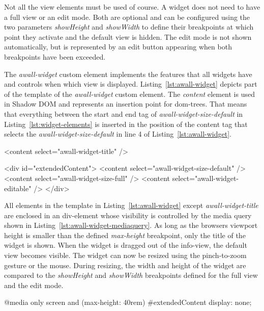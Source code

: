 \documentclass{sigchi}
\begin{document}
Not all the view elements must be used of course.
A widget does not need to have a full view or an edit mode.
Both are optional and can be configured using the two parameters \textit{showHeight} and \textit{showWidth} to define their breakpoints at which point they activate and the default view is hidden.
The edit mode is not shown automatically, but is represented by an edit button appearing when both breakpoints have been exceeded.


The \textit{awall-widget} custom element implements the features that all widgets have and controls when which view is displayed.
Listing~\ref{lst:awall-widget} depicts part of the template of the \textit{awall-widget} custom element.
The \textit{content} element is used in Shadow DOM and represents an insertion point for \gls{dom}-trees.
That means that everything between the start and end tag of \textit{awall-widget-size-default} in Listing~\ref{lst:widget-elements} is inserted in the position of the content tag that selects the \textit{awall-widget-size-default} in line 4 of Listing~\ref{lst:awall-widget}.


\begin{code}[caption={Part of the awall-widget custom element's template using insertion points for the different HTML tags.},label=lst:awall-widget]
<content select="awall-widget-title" />

<div id="extendedContent">
  <content select="awall-widget-size-default" />
  <content select="awall-widget-size-full" />
  <content select="awall-widget-editable" />
</div>
\end{code}


All elements in the template in Listing~\ref{lst:awall-widget} except \textit{awall-widget-title} are enclosed in an div-element whose visibility is controlled by the media query shown in Listing~\ref{lst:awall-widget-mediaquery}.
As long as the browsers viewport height is smaller than the defined \textit{max-height} breakpoint, only the title of the widget is shown.
When the widget is dragged out of the info-view, the default view becomes visible.
The widget can now be resized using the pinch-to-zoom gesture or the mouse.
During resizing, the width and height of the widget are compared to the \textit{showHeight} and \textit{showWidth} breakpoints defined for the full view and the edit mode.

\begin{code}[caption={Media Query hiding all the views except the title when the screen is small enough.},label=lst:awall-widget-mediaquery]
@media only screen and (max-height: 40rem) {
  #extendedContent {
    display: none;
  }
}
\end{code}
\end{document}
